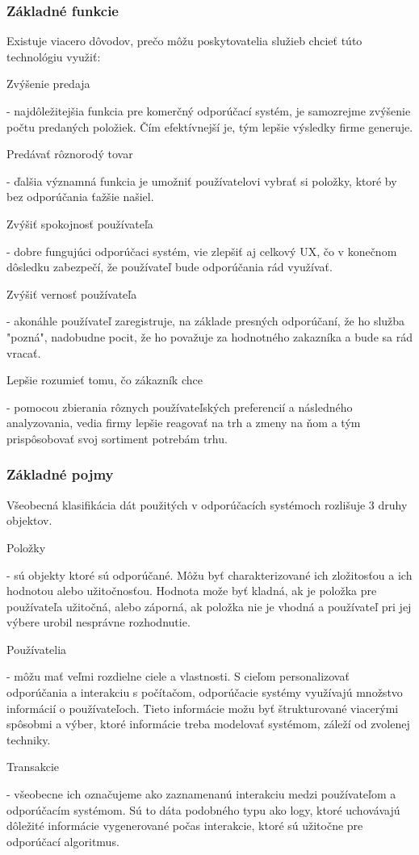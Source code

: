 \subsubsection{Základné funkcie}
Existuje viacero dôvodov, prečo môžu poskytovatelia služieb chcieť túto technológiu využiť: 
 \begin{itemize}[leftmargin=*]
{\bf \item Zvýšenie predaja} - najdôležitejšia funkcia pre komerčný odporúčací systém, je samozrejme zvýšenie počtu predaných položiek. Čím efektívnejší je, tým lepšie výsledky firme generuje.

{\bf \item Predávať rôznorodý tovar} - ďalšia významná funkcia je umožniť používatelovi vybrať si položky, ktoré by bez odporúčania ťažšie našiel.
 
	{\bf \item Zvýšiť spokojnosť používateľa} - dobre fungujúci odporúčaci systém, vie zlepšiť aj celkový UX, čo v konečnom dôsledku zabezpečí, že používateľ bude odporúčania rád využívať.

	{\bf \item Zvýšiť vernosť používateľa} - akonáhle používateľ zaregistruje, na základe presných odporúčaní, že ho služba "pozná", nadobudne pocit, že ho považuje za hodnotného zakazníka a bude sa rád vracať.
	
	{\bf \item Lepšie rozumieť tomu, čo zákazník chce} - pomocou zbierania rôznych používateľských preferencií a následného analyzovania, vedia firmy lepšie reagovať na trh a zmeny na ňom a tým prispôsobovať svoj sortiment potrebám trhu.  \newline

\end{itemize} 


\subsubsection{Základné pojmy}
Všeobecná klasifikácia dát použitých v odporúčacích systémoch rozlišuje 3 druhy objektov.
 \begin{itemize}[leftmargin=*]
{\bf \item Položky} - sú objekty ktoré sú odporúčané. Môžu byť charakterizované ich zložitosťou a ich hodnotou alebo užitočnosťou. Hodnota može byť kladná, ak je položka pre používateľa užitočná, alebo záporná, ak položka nie je vhodná a používateľ pri jej výbere urobil nesprávne rozhodnutie.
{\bf \item Používatelia} - môžu mať veľmi rozdielne ciele a vlastnosti. S cieľom personalizovať odporúčania a interakciu s počítačom, odporúčacie systémy využívajú množstvo informácií o používateľoch. Tieto informácie možu byť štrukturované viacerými spôsobmi a výber, ktoré informácie treba modelovať systémom, záleží od zvolenej techniky. 
{\bf \item Transakcie} - všeobecne ich označujeme ako zaznamenanú interakciu medzi používateľom a odporúčacím systémom. Sú to dáta podobného typu ako logy, ktoré uchovávajú dôležité informácie vygenerované počas interakcie, ktoré sú užitočne pre odporúčací algoritmus.
\end{itemize} 


